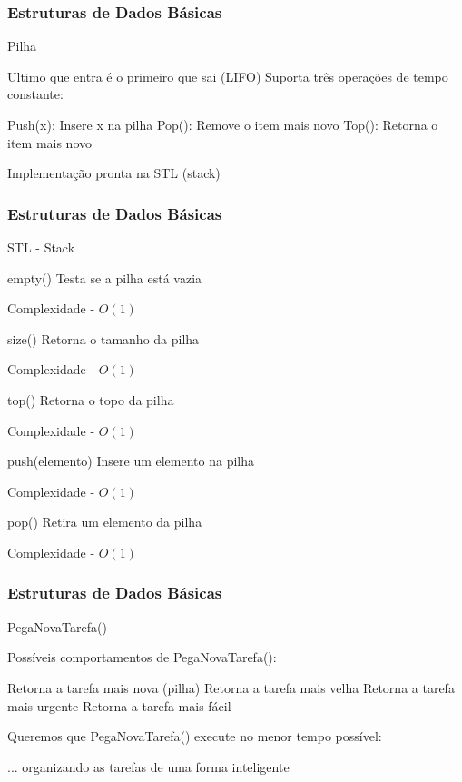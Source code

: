 \begin{frame}
\frametitle{Estruturas de Dados Básicas}
\begin{block}{Pilha}
\begin{itemize}
	\bitem Ultimo que entra é o primeiro que sai (LIFO)
	\bitem Suporta três operações de tempo constante:
	\begin{itemize}
		\bitem Push(x): Insere x na pilha
		\bitem Pop(): Remove o item mais novo
		\bitem Top(): Retorna o item mais novo
	\end{itemize}
	\bitem Implementação pronta na STL (stack)
\end{itemize}
\end{block}
\end{frame}

\begin{frame}
\frametitle{Estruturas de Dados Básicas}
\begin{block}{STL - Stack}
\begin{itemize}
	\bitem empty() Testa se a pilha está vazia
	\begin{itemize}
		\bitem Complexidade - $O(1)$
	\end{itemize}
	\bitem size() Retorna o tamanho da pilha
	\begin{itemize}
		\bitem Complexidade - $O(1)$
	\end{itemize}
	\bitem top() Retorna o topo da pilha
	\begin{itemize}
		\bitem Complexidade - $O(1)$
	\end{itemize}
	\bitem push(elemento) Insere um elemento na pilha
	\begin{itemize}
		\bitem Complexidade - $O(1)$
	\end{itemize}
	\bitem pop() Retira um elemento da pilha
	\begin{itemize}
		\bitem Complexidade - $O(1)$
	\end{itemize}
\end{itemize}
\end{block}
\end{frame}

\begin{frame}
\frametitle{Estruturas de Dados Básicas}
\begin{block}{PegaNovaTarefa()}
\begin{itemize}
	\bitem Possíveis comportamentos de PegaNovaTarefa():
	\begin{itemize}
		\bitem Retorna a tarefa mais nova (pilha)
		\bitem Retorna a tarefa mais velha
		\bitem Retorna a tarefa mais urgente
		\bitem Retorna a tarefa mais fácil
	\end{itemize}
	\bitem Queremos que PegaNovaTarefa() execute no menor tempo possível:
	\begin{itemize}
		\bitem ... organizando as tarefas de uma forma inteligente
	\end{itemize}
\end{itemize}
\end{block}
\end{frame}

